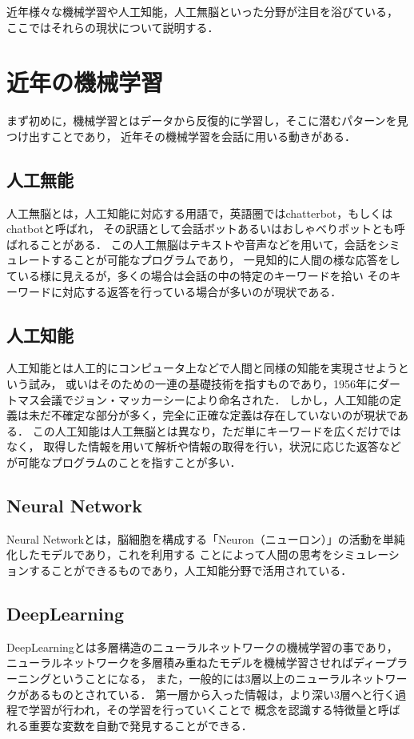 近年様々な機械学習や人工知能，人工無脳といった分野が注目を浴びている，
ここではそれらの現状について説明する．

\section{近年の機械学習}
まず初めに，機械学習とはデータから反復的に学習し，そこに潜むパターンを見つけ出すことであり，
近年その機械学習を会話に用いる動きがある．

\subsection{人工無能}
人工無脳\cite{muno}とは，人工知能に対応する用語で，英語圏ではchatterbot，もしくはchatbotと呼ばれ，
その訳語として会話ボットあるいはおしゃべりボットとも呼ばれることがある．
この人工無脳はテキストや音声などを用いて，会話をシミュレートすることが可能なプログラムであり，
一見知的に人間の様な応答をしている様に見えるが，多くの場合は会話の中の特定のキーワードを拾い
そのキーワードに対応する返答を行っている場合が多いのが現状である．

\subsection{人工知能}
人工知能\cite{tino}とは人工的にコンピュータ上などで人間と同様の知能を実現させようという試み，
或いはそのための一連の基礎技術を指すものであり，1956年にダートマス会議でジョン・マッカーシーにより命名された．
しかし，人工知能の定義は未だ不確定な部分が多く，完全に正確な定義は存在していないのが現状である．
この人工知能は人工無脳とは異なり，ただ単にキーワードを広くだけではなく，
取得した情報を用いて解析や情報の取得を行い，状況に応じた返答などが可能なプログラムのことを指すことが多い．

\subsection{Neural Network}
Neural Networkとは，脳細胞を構成する「Neuron（ニューロン）」の活動を単純化したモデルであり，これを利用する
ことによって人間の思考をシミュレーションすることができるものであり，人工知能分野で活用されている．

\subsection{DeepLearning}
DeepLearning\cite{deep}とは多層構造のニューラルネットワークの機械学習の事であり，
ニューラルネットワークを多層積み重ねたモデルを機械学習させればディープラーニングということになる，
また，一般的には3層以上のニューラルネットワークがあるものとされている．
第一層から入った情報は，より深い3層へと行く過程で学習が行われ，その学習を行っていくことで
概念を認識する特徴量と呼ばれる重要な変数を自動で発見することができる．

